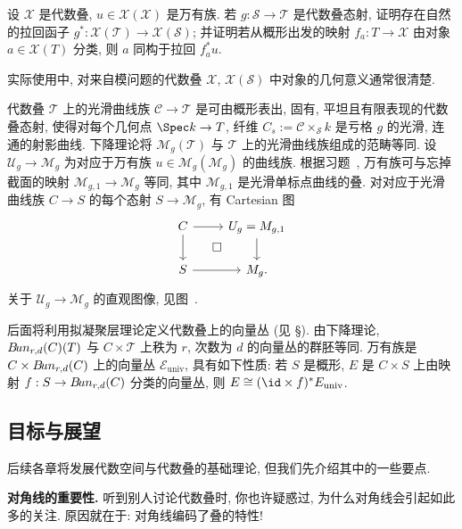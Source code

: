 \begin{exercise}[细节]\label{src:4.1.30}
设 $\mathcal X$ 是代数叠, $u\in\mathcal X(\mathcal X)$ 是万有族.
若 $g:\mathcal S\to\mathcal T$ 是代数叠态射, 证明存在自然的拉回函子 $g^*:\mathcal X(\mathcal T)\to\mathcal X(\mathcal S)$; 并证明若从概形出发的映射 $f_a:T\to\mathcal X$ 由对象 $a\in\mathcal X(T)$ 分类, 则 $a$ 同构于拉回 $f_a^*u$.
\end{exercise}
实际使用中, 对来自模问题的代数叠 $\mathcal X$, $\mathcal X(\mathcal S)$ 中对象的几何意义通常很清楚.
\begin{example}\label{src:4.1.31}
代数叠 $\mathcal T$ 上的光滑曲线族 $\mathcal C\to\mathcal T$ 是可由概形表出, 固有, 平坦且有限表现的代数叠态射, 使得对每个几何点 $\Spec k\to\mathcal T$, 纤维 $C_s:=\mathcal C\times_{\mathcal S}k$ 是亏格 $g$ 的光滑, 连通的射影曲线.
下降理论将 $\mathcal M_g(\mathcal T)$ 与 $\mathcal T$ 上的光滑曲线族组成的范畴等同.
设 $\mathcal U_g\to\mathcal M_g$ 为对应于万有族 $u\in\mathcal M_g(\mathcal M_g)$ 的曲线族.
根据习题~, 万有族可与忘掉截面的映射 $\mathcal M_{g,1}\to\mathcal M_g$ 等同, 其中 $\mathcal M_{g,1}$ 是光滑单标点曲线的叠.
对对应于光滑曲线族 $C\to S$ 的每个态射 $S\to\mathcal M_g$, 有 Cartesian 图
\[
\begin{tikzcd}
C\arrow[r]\arrow[d]\arrow[dr,phantom,"\square"]&\mathcal U_g=\mathcal M_{g,1}\arrow[d]\\
S\arrow[r]&\mathcal M_g.
\end{tikzcd}
\]
关于 $\mathcal U_g\to\mathcal M_g$ 的直观图像, 见图~.
\end{example}
\begin{example}\label{src:4.1.32}
后面将利用拟凝聚层理论定义代数叠上的向量丛 (见 \S{}).
由下降理论, $B\!un_{r,d}(C)(T)$ 与 $C\times\mathcal T$ 上秩为 $r$, 次数为 $d$ 的向量丛的群胚等同.
万有族是 $C\times B\!un_{r,d}(C)$ 上的向量丛 $\mathcal E_{\mathrm{univ}}$, 具有如下性质: 若 $S$ 是概形, $E$ 是 $C\times S$ 上由映射 $f:S\to B\!un_{r,d}(C)$ 分类的向量丛, 则 $E\cong(\id\times f)^*\mathcal E_{\mathrm{univ}}$.
\end{example}

\subsection{目标与展望}\label{src:4.1.8-subsection}
后续各章将发展代数空间与代数叠的基础理论, 但我们先介绍其中的一些要点.

\textbf{对角线的重要性.} 听到别人讨论代数叠时, 你也许疑惑过, 为什么对角线会引起如此多的关注. 原因就在于: 对角线编码了叠的特性!

